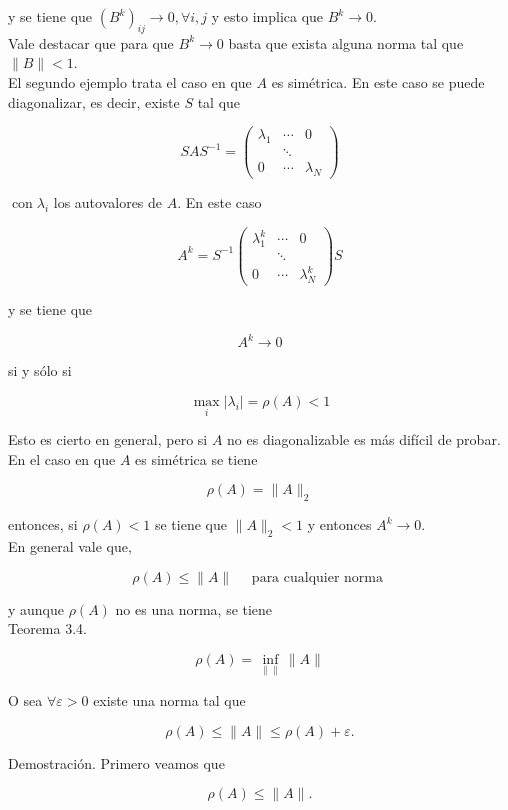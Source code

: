 \documentclass[10pt]{book}
\begin{document}
y se tiene que $\left(B^{k}\right)_{i j} \rightarrow 0, \forall i, j$ y esto implica que $B^{k} \rightarrow 0$.\\
Vale destacar que para que $B^{k} \rightarrow 0$ basta que exista alguna norma tal que $\|B\|<1$.\\
El segundo ejemplo trata el caso en que $A$ es simétrica. En este caso se puede diagonalizar, es decir, existe $S$ tal que

$$
S A S^{-1}=\left(\begin{array}{ccc}
\lambda_{1} & \cdots & 0 \\
& \ddots & \\
0 & \cdots & \lambda_{N}
\end{array}\right)
$$

$\operatorname{con} \lambda_{i}$ los autovalores de $A$. En este caso

$$
A^{k}=S^{-1}\left(\begin{array}{ccc}
\lambda_{1}^{k} & \cdots & 0 \\
& \ddots & \\
0 & \cdots & \lambda_{N}^{k}
\end{array}\right) S
$$

y se tiene que

$$
A^{k} \rightarrow 0
$$

si y sólo si

$$
\max _{i}\left|\lambda_{i}\right|=\rho(A)<1
$$

Esto es cierto en general, pero si $A$ no es diagonalizable es más difícil de probar.\\
En el caso en que $A$ es simétrica se tiene

$$
\rho(A)=\|A\|_{2}
$$

entonces, si $\rho(A)<1$ se tiene que $\|A\|_{2}<1$ y entonces $A^{k} \rightarrow 0$.\\
En general vale que,

$$
\rho(A) \leq\|A\| \quad \text { para cualquier norma }
$$

y aunque $\rho(A)$ no es una norma, se tiene\\
Teorema 3.4.

$$
\rho(A)=\inf _{\| \|}\|A\|
$$

O sea $\forall \varepsilon>0$ existe una norma tal que

$$
\rho(A) \leq\|A\| \leq \rho(A)+\varepsilon .
$$

Demostración. Primero veamos que

$$
\rho(A) \leq\|A\| .
$$
\end{document}

